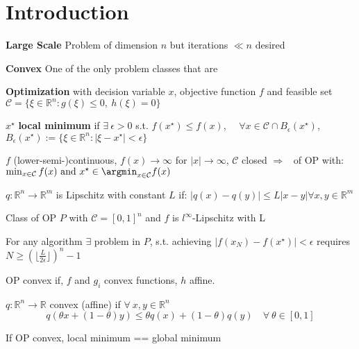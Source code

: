 \section{Introduction}


\textbf{Large Scale}
Problem of dimension $n$ but iterations $\ll n$ desired

\textbf{Convex}
One of the only problem classes that are 

\textbf{Optimization}
with decision variable $x$, objective function $f$ and
feasible set $\mathcal{C} = \{\xi \in \mathbb{R}^{n}: g(\xi)\le0,\ h(\xi)=0\}$

$x^\star$ \textbf{local minimum} if $\exists\ \epsilon > 0$ s.t.
$f(x^\star)\leq f(x)$, $\quad \forall x \in \mathcal{C} \cap B_\epsilon(x^\star)$,
$B_\epsilon(x^\star):=\{\xi\in\mathbb{R}^{n}:|\xi-x^\star|<\epsilon\}$


\begin{proposition}
	$f$ (lower-semi-)continuous,
	$f(x)\rightarrow\infty$
	for $|x|\rightarrow\infty$,
	$\mathcal{C}$ closed
	$\Rightarrow$ \exists\ of OP with:
	$\min_{x \in \mathcal{C}} f(x)\ \text{and}\ x^\star\in\argmin_{x \in \mathcal{C}}f(x)$
\end{proposition}


\begin{definition}
	$q: \mathbb{R}^{n} \rightarrow \mathbb{R}^{m}$
	is Lipschitz with constant $L$ if:
	$|q(x)-q(y)| \le L |x-y| \forall x,y \in \mathbb{R}^{m}$
\end{definition}

Class of OP $P$ with $\mathcal{C}=[0,1]^n$
and $f$ is $l^\infty$-Lipschitz with L

\begin{proposition}
	For any algorithm $\exists$ problem in $P$,
	s.t. achieving $|f(x_N )−f(x^⋆)| < \epsilon$
	requires
	$N \ge (\lfloor\frac{L}{2\epsilon}\rfloor)^n-1$
\end{proposition}

\begin{definition}
	OP convex if, $f$ and $g_i$ convex functions, $h$ affine.
\end{definition}


\begin{definition}
	$q:\mathbb{R}^{n}\rightarrow\mathbb{R}$
	convex (affine) if $\forall\ x, y \in \mathbb{R}^{n}$
	$$q(\theta x+(1−\theta)y)\le\theta q(x)+(1−\theta)q(y)\quad\forall\ \theta \in [0, 1]$$
\end{definition}
\begin{proposition}
	If OP convex, local minimum == global minimum
\end{proposition}
